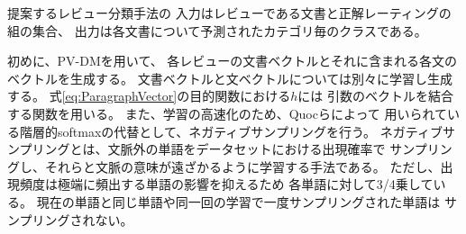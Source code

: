 \documentclass[twocolumn,a4paper]{ltjarticle}
\begin{document}
提案するレビュー分類手法の
入力はレビューである文書と正解レーティングの組の集合、
出力は各文書について予測されたカテゴリ毎のクラスである。

初めに、PV-DMを用いて、
各レビューの文書ベクトルとそれに含まれる各文のベクトルを生成する。
文書ベクトルと文ベクトルについては別々に学習し生成する。
式\ref{eq:ParagraphVector}の目的関数における$h$には
引数のベクトルを結合する関数を用いる。
また、学習の高速化のため、Quocら\cite{quoc14}によって
用いられている階層的softmaxの代替として、ネガティブサンプリングを行う。
ネガティブサンプリングとは、文脈外の単語をデータセットにおける出現確率で
サンプリングし、それらと文脈の意味が遠ざかるように学習する手法である。
ただし、出現頻度は極端に頻出する単語の影響を抑えるため
各単語に対して3/4乗している。
現在の単語と同じ単語や同一回の学習で一度サンプリングされた単語は
サンプリングされない。
\end{document}
